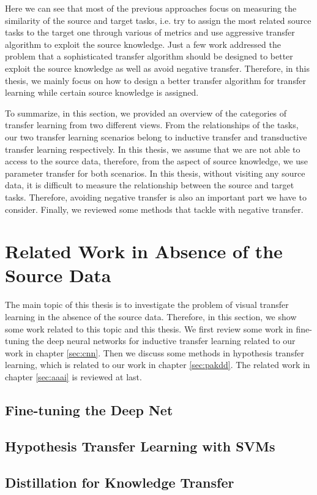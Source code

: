 Here we can see that most of the previous approaches focus on measuring the similarity of the source and target tasks, i.e. try to assign the most related source tasks to the target one through various of metrics and use aggressive transfer algorithm to exploit the source knowledge. Just a few work \cite{kuzborskij2013stability} \cite{tommasi2010safety} addressed the problem that a sophisticated transfer algorithm should be designed to better exploit the source knowledge as well as avoid negative transfer. Therefore, in this thesis, we mainly focus on how to design a better transfer algorithm for transfer learning while certain source knowledge is assigned. 

To summarize, in this section, we provided an overview of the categories of transfer learning from two different views. From the relationships of the tasks, our two transfer learning scenarios belong to inductive transfer and transductive transfer learning respectively. In this thesis, we assume that we are not able to access to the source data, therefore, from the aspect of source knowledge, we use parameter transfer for both scenarios. In this thesis, without visiting any source data, it is difficult to measure the relationship between the source and target tasks. Therefore, avoiding negative transfer is also an important part we have to consider. Finally, we reviewed some methods that tackle with negative transfer.

\section{Related Work in Absence of the Source Data}
The main topic of this thesis is to investigate the problem of visual transfer learning in the absence of the source data. Therefore, in this section, we show some work related to this topic and this thesis. We first review some work in fine-tuning the deep neural networks for inductive transfer learning related to our work in chapter \ref{sec:cnn}. Then we discuss some methods in hypothesis transfer learning, which is related to our work in chapter \ref{sec:pakdd}. The related work in chapter \ref{sec:aaai} is reviewed at last.

\subsection{Fine-tuning the Deep Net}


\subsection{Hypothesis Transfer Learning with SVMs}


\subsection{Distillation for Knowledge Transfer}

 


